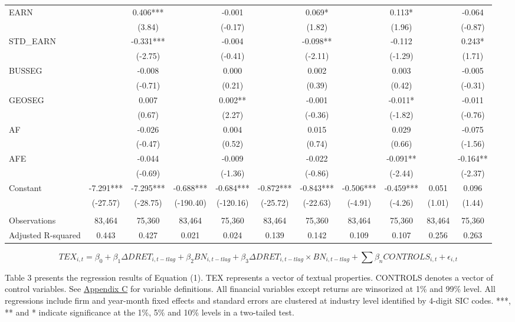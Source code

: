 \begin{table}[H]
\begin{center}
\begin{tabular}{lcccccccccc}
			EARN &    & 0.406*** &   & -0.001 &   & 0.069* &   & 0.113* &   & -0.064 \\
			&   & (3.84) &   & (-0.17) &   & (1.82) &   & (1.96) &   & (-0.87) \\
			STD\_EARN &    & -0.331*** &   & -0.004 &   & -0.098** &   & -0.112 &   & 0.243* \\
			&   & (-2.75) &   & (-0.41) &   & (-2.11) &   & (-1.29) &   & (1.71) \\
			BUSSEG &    & -0.008 &   & 0.000 &   & 0.002 &   & 0.003 &   & -0.005 \\
			&    & (-0.71) &   & (0.21) &   & (0.39) &   & (0.42) &   & (-0.31) \\
			GEOSEG &    & 0.007 &   & 0.002** &   & -0.001 &   & -0.011* &   & -0.011 \\
			&    & (0.67) &   & (2.27) &   & (-0.36) &   & (-1.82) &   & (-0.76) \\
			AF &    & -0.026 &   & 0.004 &   & 0.015 &   & 0.029 &   & -0.075 \\
			&    & (-0.47) &   & (0.52) &   & (0.74) &   & (0.66) &   & (-1.56) \\
			AFE &   & -0.044 &   & -0.009 &   & -0.022 &   & -0.091** &   & -0.164** \\
			&   & (-0.69) &   & (-1.36) &   & (-0.86) &   & (-2.44) &   & (-2.37) \\
			Constant & -7.291*** & -7.295*** & -0.688*** & -0.684*** & -0.872*** & -0.843*** & -0.506*** & -0.459*** & 0.051 & 0.096 \\
			&  (-27.57) & (-28.75) & (-190.40) & (-120.16) & (-25.72) & (-22.63) & (-4.91) & (-4.26) & (1.01) & (1.44) \\
			&   &   &   &   &   &   &   &   &   &  \\
			Observations & 83,464 & 75,360 & 83,464 & 75,360 & 83,464 & 75,360 & 83,464 & 75,360 & 83,464 & 75,360 \\
			Adjusted R-squared & 0.443 & 0.427 & 0.021 & 0.024 & 0.139 & 0.142 & 0.109 & 0.107 & 0.256 & 0.263 \\
			\bottomrule
			\bottomrule
		\end{tabular}%
	\end{center}
		\begin{footnotesize}
			\setcounter{equation}{0}
			\begin{equation}
				TEX_{i,t}=\beta_0+\beta_1\Delta DRET_{i,t-tlag}+\beta_2BN_{i,t-tlag}+\beta_3\Delta DRET_{i,t-tlag}\times 	BN_{i,t-tlag}+\sum\beta_nCONTROLS_{i,t}+\epsilon_{i,t}
			\end{equation}
			
			\noindent Table 3 presents the regression results of Equation (1). TEX represents a vector of textual properties. CONTROLS denotes a vector of control variables. See \hyperref[appc]{Appendix C} for variable definitions. All financial variables except returns are winsorized at 1\% and 99\% level. All regressions include firm and year-month fixed effects and standard errors are clustered at industry level identified by 4-digit SIC codes. ***, ** and * indicate significance at the 1\%, 5\% and 10\% levels in a two-tailed test.
		\end{footnotesize}
\end{table}%